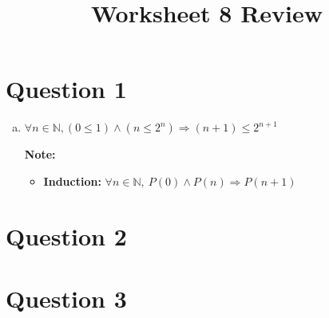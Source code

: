 \documentclass[12pt]{article}
\begin{document}
\title{Worksheet 8 Review}
\maketitle

\section*{Question 1}
\begin{enumerate}[a.]
    \item

    $\forall n \in \mathbb{N,} (0 \leq 1) \land (n \leq 2^n) \Rightarrow (n+1) \leq 2^{n+1}$

    \bigskip

    \textbf{Note:}
    \begin{itemize}
        \item \textbf{Induction:} $\forall n \in \mathbb{N},\:P(0) \land P(n) \Rightarrow P(n+1)$
    \end{itemize}
\end{enumerate}

\section*{Question 2}

\section*{Question 3}
\end{document}
